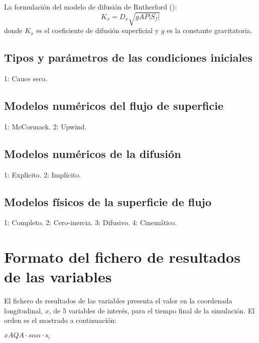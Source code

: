 \documentclass[a4paper,12pt]{report}
\begin{document}
La formulación del modelo de difusión de Rutherford (\cite{JaviSurcos1}):
\begin{equation}
K_x=D_x\sqrt{gAP|S_f|}
\end{equation}
\noindent donde $K_x$ es el coeficiente de difusión superficial y $g$ es la constante gravitatoria.

\subsection{Tipos y parámetros de las condiciones iniciales}
\begin{verbatimtab}[4]
		1: Cauce seco.
\end{verbatimtab}

\subsection{Modelos numéricos del flujo de superficie}
\begin{verbatimtab}
	1: McCormack.
	2: Upwind.
\end{verbatimtab}

\subsection{Modelos numéricos de la difusión}
\begin{verbatimtab}
	1: Explícito.
	2: Implícito.
\end{verbatimtab}

\subsection{Modelos físicos de la superficie de flujo}
\begin{verbatimtab}
	1: Completo.
	2: Cero-inercia.
	3: Difusivo.
	4: Cinemático.
\end{verbatimtab}


\section{Formato del fichero de resultados de las variables}
El fichero de resultados de las variables presenta el valor en la coordenada longitudinal, $x$, de 5 variables de interés, para el tiempo final de la simulación. El orden es el mostrado a continuación:

\hspace{1.8cm}$x$\hspace{0.9cm}$A$\hspace{0.9cm}$Q$\hspace{0.9cm}$A\cdot s$\hspace{0.9cm}$\alpha$\hspace{0.9cm}$\alpha\cdot s_i$ 
\end{document}
